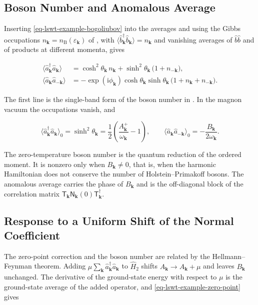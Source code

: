 \subsection{Boson Number and Anomalous Average}

Inserting \eqref{eq-lswt-example-bogoliubov} into the averages and using the Gibbs occupations \(n_{\mathbf k}=n_{\mathrm B}(\varepsilon_{\mathbf k})\) of , with \(\langle\hat b_{\mathbf k}^\dagger\hat b_{\mathbf k}\rangle=n_{\mathbf k}\) and vanishing averages of \(\hat b\hat b\) and of products at different momenta, gives

\begin{equation}\label{eq-lswt-example-averages}
\begin{aligned}
\langle\hat a_{\mathbf k}^\dagger\hat a_{\mathbf k}\rangle
&=\cosh^2\theta_{\mathbf k}\,n_{\mathbf k}+\sinh^2\theta_{\mathbf k}\,\big(1+n_{-\mathbf k}\big),\\
\langle\hat a_{\mathbf k}\hat a_{-\mathbf k}\rangle
&=-\exp(\mathrm i\phi_{\mathbf k})\cosh\theta_{\mathbf k}\sinh\theta_{\mathbf k}\,\big(1+n_{\mathbf k}+n_{-\mathbf k}\big).
\end{aligned}
\end{equation}

The first line is the single-band form of the boson number in . In the magnon vacuum the occupations vanish, and

\[
\langle\hat a_{\mathbf k}^\dagger\hat a_{\mathbf k}\rangle_0=\sinh^2\theta_{\mathbf k}=\frac12\left(\frac{A_{\mathbf k}^{+}}{\omega_{\mathbf k}}-1\right),
\qquad
\langle\hat a_{\mathbf k}\hat a_{-\mathbf k}\rangle_0=-\frac{B_{\mathbf k}}{2\omega_{\mathbf k}}.
\]

The zero-temperature boson number is the quantum reduction of the ordered moment. It is nonzero only when \(B_{\mathbf k}\ne0\), that is, when the harmonic Hamiltonian does not conserve the number of Holstein--Primakoff bosons. The anomalous average carries the phase of \(B_{\mathbf k}\) and is the off-diagonal block of the correlation matrix \(\mathsf T_{\mathbf k}\mathsf N_{\mathbf k}(0)\mathsf T_{\mathbf k}^\dagger\).

\subsection{Response to a Uniform Shift of the Normal Coefficient}

The zero-point correction and the boson number are related by the Hellmann--Feynman theorem. Adding \(\mu\sum_{\mathbf k}\hat a_{\mathbf k}^\dagger\hat a_{\mathbf k}\) to \(\hat H_2\) shifts \(A_{\mathbf k}\to A_{\mathbf k}+\mu\) and leaves \(B_{\mathbf k}\) unchanged. The derivative of the ground-state energy with respect to \(\mu\) is the ground-state average of the added operator, and \eqref{eq-lswt-example-zero-point} gives

